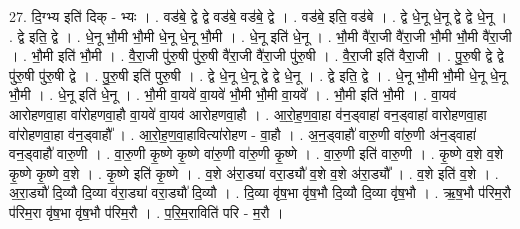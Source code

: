 \documentclass[17pt]{extarticle}
\begin{document}
27. दि॒ग्भ्य इति॑ दिक् - भ्यः । . वड॑बे॒ द्वे द्वे वड॑बे॒ वड॑बे॒ द्वे । . वड॑बे॒ इति॒ वड॑बे । . द्वे धे॒नू धे॒नू द्वे द्वे धे॒नू । . द्वे इति॒ द्वे । . धे॒नू भौ॒मी भौ॒मी धे॒नू धे॒नू भौ॒मी । . धे॒नू इति॑ धे॒नू । . भौ॒मी वै॑रा॒जी वै॑रा॒जी भौ॒मी भौ॒मी वै॑रा॒जी । . भौ॒मी इति॑ भौ॒मी । . वै॒रा॒जी पु॑रु॒षी पु॑रु॒षी वै॑रा॒जी वै॑रा॒जी पु॑रु॒षी । . वै॒रा॒जी इति॑ वैरा॒जी । . पु॒रु॒षी द्वे द्वे पु॑रु॒षी पु॑रु॒षी द्वे । . पु॒रु॒षी इति॑ पुरु॒षी । . द्वे धे॒नू धे॒नू द्वे द्वे धे॒नू । . द्वे इति॒ द्वे । . धे॒नू भौ॒मी भौ॒मी धे॒नू धे॒नू भौ॒मी । . धे॒नू इति॑ धे॒नू । . भौ॒मी वा॒यवे॑ वा॒यवे॑ भौ॒मी भौ॒मी वा॒यवे᳚ । . भौ॒मी इति॑ भौ॒मी । . वा॒यव॑ आरोहणवा॒हा वा॑रोहणवा॒हौ वा॒यवे॑ वा॒यव॑ आरोहणवा॒हौ । . आ॒रो॒ह॒ण॒वा॒हा व॑न॒ड्वाहा॑ वन॒ड्वाहा॑ वारोहणवा॒हा वा॑रोहणवा॒हा व॑न॒ड्वाहौ᳚ । . आ॒रो॒ह॒ण॒वा॒हावित्या॑रोहण - वा॒हौ । . अ॒न॒ड्वाहौ॑ वारु॒णी वा॑रु॒णी अ॑न॒ड्वाहा॑ वन॒ड्वाहौ॑ वारु॒णी । . वा॒रु॒णी कृ॒ष्णे कृ॒ष्णे वा॑रु॒णी वा॑रु॒णी कृ॒ष्णे । . वा॒रु॒णी इति॑ वारु॒णी । . कृ॒ष्णे व॒शे व॒शे कृ॒ष्णे कृ॒ष्णे व॒शे । . कृ॒ष्णे इति॑ कृ॒ष्णे । . व॒शे अ॑रा॒ड्या॑ वरा॒ड्यौ॑ व॒शे व॒शे अ॑रा॒ड्यौ᳚ । . व॒शे इति॑ व॒शे । . अ॒रा॒ड्यौ॑ दि॒व्यौ दि॒व्या व॑रा॒ड्या॑ वरा॒ड्यौ॑ दि॒व्यौ । . दि॒व्या वृ॑ष॒भा वृ॑ष॒भौ दि॒व्यौ दि॒व्या वृ॑ष॒भौ । . ऋ॒ष॒भौ प॑रिम॒रौ प॑रिम॒रा वृ॑ष॒भा वृ॑ष॒भौ प॑रिम॒रौ । . प॒रि॒म॒राविति॑ परि - म॒रौ । \newline
\end{document}
